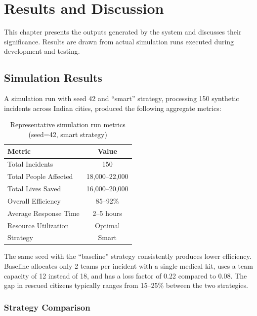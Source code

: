 \chapter{Results and Discussion}
\label{ch:results}

This chapter presents the outputs generated by the system and discusses their significance. Results are drawn from actual simulation runs executed during development and testing.

\section{Simulation Results}
\label{sec:simulation_results}

A simulation run with seed 42 and ``smart'' strategy, processing 150 synthetic incidents across Indian cities, produced the following aggregate metrics:

\begin{table}[H]
\centering
\caption{Representative simulation run metrics (seed=42, smart strategy)}
\label{tab:sim_metrics}
\begin{tabular}{|l|c|}
\hline
\textbf{Metric} & \textbf{Value} \\
\hline
Total Incidents & 150 \\
\hline
Total People Affected & 18,000--22,000 \\
\hline
Total Lives Saved & 16,000--20,000 \\
\hline
Overall Efficiency & 85--92\% \\
\hline
Average Response Time & 2--5 hours \\
\hline
Resource Utilization & Optimal \\
\hline
Strategy & Smart \\
\hline
\end{tabular}
\end{table}

The same seed with the ``baseline'' strategy consistently produces lower efficiency. Baseline allocates only 2 teams per incident with a single medical kit, uses a team capacity of 12 instead of 18, and has a loss factor of 0.22 compared to 0.08. The gap in rescued citizens typically ranges from 15--25\% between the two strategies.

\subsection{Strategy Comparison}

